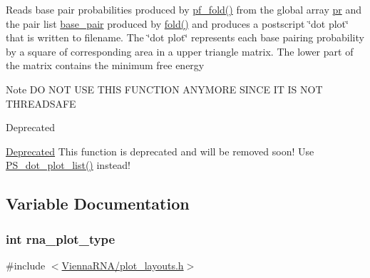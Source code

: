 Reads base pair probabilities produced by \hyperlink{group__pf__fold_gadc3db3d98742427e7001a7fd36ef28c2}{pf\+\_\+fold()} from the global array \hyperlink{fold__vars_8h_ac98ec419070aee6831b44e5c700f090f}{pr} and the pair list \hyperlink{fold__vars_8h_a0244a629b5ab4f58b77590c3dfd130dc}{base\+\_\+pair} produced by \hyperlink{group__mfe__fold__single_gaadafcb0f140795ae62e5ca027e335a9b}{fold()} and produces a postscript \char`\"{}dot plot\char`\"{} that is written to \textquotesingle{}filename\textquotesingle{}. The \char`\"{}dot plot\char`\"{} represents each base pairing probability by a square of corresponding area in a upper triangle matrix. The lower part of the matrix contains the minimum free energy \begin{DoxyNote}{Note}
DO N\+OT U\+SE T\+H\+IS F\+U\+N\+C\+T\+I\+ON A\+N\+Y\+M\+O\+RE S\+I\+N\+CE IT IS N\+OT T\+H\+R\+E\+A\+D\+S\+A\+FE
\end{DoxyNote}
\begin{DoxyRefDesc}{Deprecated}
\item[\hyperlink{deprecated__deprecated000130}{Deprecated}]This function is deprecated and will be removed soon! Use \hyperlink{group__plotting__utils_ga00ea223b5cf02eb2faae5ff29f0d5e12}{P\+S\+\_\+dot\+\_\+plot\+\_\+list()} instead! \end{DoxyRefDesc}


\subsection{Variable Documentation}
\subsubsection[{\texorpdfstring{rna\+\_\+plot\+\_\+type}{rna_plot_type}}]{\setlength{\rightskip}{0pt plus 5cm}int rna\+\_\+plot\+\_\+type}\hypertarget{group__plotting__utils_ga5964c4581431b098b80027d6e14dcdd4}{}\label{group__plotting__utils_ga5964c4581431b098b80027d6e14dcdd4}


{\ttfamily \#include $<$\hyperlink{plot__layouts_8h}{Vienna\+R\+N\+A/plot\+\_\+layouts.\+h}$>$}



